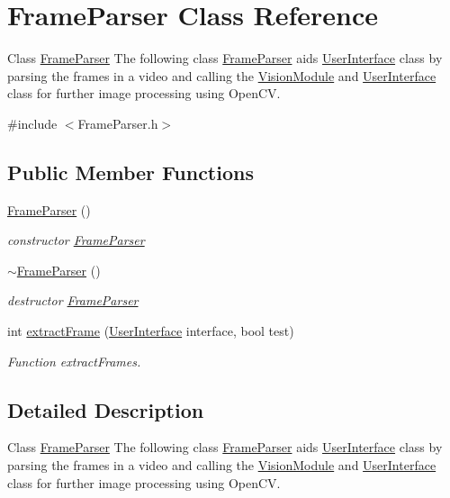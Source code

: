 \hypertarget{classFrameParser}{}\section{Frame\+Parser Class Reference}
\label{classFrameParser}


Class \hyperlink{classFrameParser}{Frame\+Parser} The following class \hyperlink{classFrameParser}{Frame\+Parser} aids \hyperlink{classUserInterface}{User\+Interface} class by parsing the frames in a video and calling the \hyperlink{classVisionModule}{Vision\+Module} and \hyperlink{classUserInterface}{User\+Interface} class for further image processing using Open\+CV.  




{\ttfamily \#include $<$Frame\+Parser.\+h$>$}

\subsection*{Public Member Functions}
\begin{DoxyCompactItemize}
\item 
\hyperlink{classFrameParser_adf34f5de47578ffa08286152d50ce43f}{Frame\+Parser} ()
\begin{DoxyCompactList}\small\item\em constructor \hyperlink{classFrameParser}{Frame\+Parser} \end{DoxyCompactList}\item 
\hyperlink{classFrameParser_a844ec6e5e1978dbf60944a072f4bbadc}{$\sim$\+Frame\+Parser} ()
\begin{DoxyCompactList}\small\item\em destructor \hyperlink{classFrameParser}{Frame\+Parser} \end{DoxyCompactList}\item 
int \hyperlink{classFrameParser_aa3b62170c32136f78af7465bf13d4485}{extract\+Frame} (\hyperlink{classUserInterface}{User\+Interface} interface, bool test)
\begin{DoxyCompactList}\small\item\em Function extract\+Frames. \end{DoxyCompactList}\end{DoxyCompactItemize}


\subsection{Detailed Description}
Class \hyperlink{classFrameParser}{Frame\+Parser} The following class \hyperlink{classFrameParser}{Frame\+Parser} aids \hyperlink{classUserInterface}{User\+Interface} class by parsing the frames in a video and calling the \hyperlink{classVisionModule}{Vision\+Module} and \hyperlink{classUserInterface}{User\+Interface} class for further image processing using Open\+CV. 

